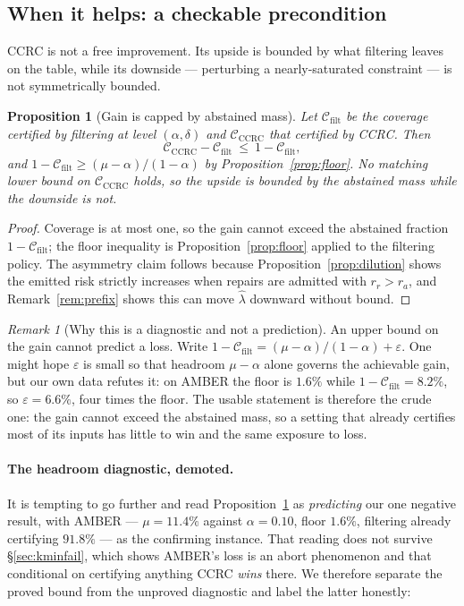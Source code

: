 \documentclass[review,number,doubleblind]{elsarticle}
\theoremstyle{plain}
\newtheorem{proposition}{Proposition}
\theoremstyle{definition}
\theoremstyle{remark}
\newtheorem{remark}{Remark}
\newcommand{\Cov}{\mathcal{C}}
\begin{document}
\subsection{When it helps: a checkable precondition}
\label{sec:precondition}

CCRC is not a free improvement. Its upside is bounded by what filtering leaves on the
table, while its downside --- perturbing a nearly-saturated constraint --- is not
symmetrically bounded.

\begin{proposition}[Gain is capped by abstained mass]
\label{prop:precondition}
Let $\Cov_{\mathrm{filt}}$ be the coverage certified by filtering at level $(\alpha,\delta)$
and $\Cov_{\mathrm{CCRC}}$ that certified by CCRC. Then
\[
\Cov_{\mathrm{CCRC}}-\Cov_{\mathrm{filt}}\ \le\ 1-\Cov_{\mathrm{filt}},
\]
and $1-\Cov_{\mathrm{filt}}\ge(\mu-\alpha)/(1-\alpha)$ by
Proposition~\ref{prop:floor}. No matching lower bound on $\Cov_{\mathrm{CCRC}}$ holds, so
the upside is bounded by the abstained mass while the downside is not.
\end{proposition}

\begin{proof}
Coverage is at most one, so the gain cannot exceed the abstained fraction
$1-\Cov_{\mathrm{filt}}$; the floor inequality is Proposition~\ref{prop:floor} applied to
the filtering policy. The asymmetry claim follows because
Proposition~\ref{prop:dilution} shows the emitted risk strictly increases when repairs are
admitted with $r_r>r_a$, and Remark~\ref{rem:prefix} shows this can move $\hat\lambda$
downward without bound.
\end{proof}

\begin{remark}[Why this is a diagnostic and not a prediction]
\label{rem:notprediction}
An upper bound on the gain cannot predict a loss. Write
$1-\Cov_{\mathrm{filt}}=(\mu-\alpha)/(1-\alpha)+\varepsilon$. One might hope $\varepsilon$
is small so that headroom $\mu-\alpha$ alone governs the achievable gain, but our own data
refutes it: on AMBER the floor is $1.6\%$ while $1-\Cov_{\mathrm{filt}}=8.2\%$, so
$\varepsilon=6.6\%$, four times the floor. The usable statement is therefore the crude one:
the gain cannot exceed the abstained mass, so a setting that already certifies most of its
inputs has little to win and the same exposure to loss.
\end{remark}

\paragraph{The headroom diagnostic, demoted.}
It is tempting to go further and read Proposition~\ref{prop:precondition} as \emph{predicting}
our one negative result, with AMBER --- $\mu=11.4\%$ against $\alpha=0.10$, floor $1.6\%$,
filtering already certifying $91.8\%$ --- as the confirming instance. That reading
does not survive \S\ref{sec:kminfail}, which shows AMBER's loss is an abort phenomenon and that
conditional on certifying anything CCRC \emph{wins} there. We therefore separate the proved
bound from the unproved diagnostic and label the latter honestly:
\end{document}
